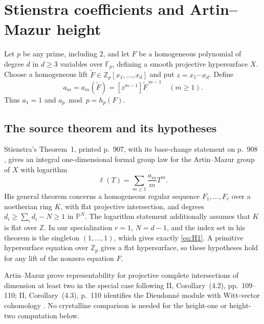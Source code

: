 \section{Stienstra coefficients and Artin--Mazur height}
\label{sec:classical-height}
Let $p$ be any prime, including $2$, and let $F$ be a homogeneous
polynomial of degree $d$ in $d\ge3$ variables over $\mathbb F_p$,
defining a smooth projective hypersurface $X$.
Choose a homogeneous lift $\widetilde F\in\mathbb Z_p[x_1,\ldots,x_d]$
and put $z=x_1\cdots x_d$. Define
\begin{equation}
 a_m=a_m(\widetilde F)=[z^{m-1}]\widetilde F^{\,m-1}\quad(m\ge1).
 \label{eq:H1}
\end{equation}
Thus $a_1=1$ and $a_p\bmod p=h_p(F)$.

\subsection{The source theorem and its hypotheses}
Stienstra's Theorem~1, printed p.~907, with its base-change statement
on p.~908 \citep{Stienstra}, gives an integral one-dimensional formal
group law for the Artin--Mazur group of $X$ with logarithm
\begin{equation}
 \ell(T)=\sum_{m\ge1}\frac{a_m}{m}T^m.                 \label{eq:H2}
\end{equation}
His general theorem concerns a homogeneous regular sequence
$F_1,\ldots,F_r$ over a noetherian ring $K$, with flat projective
intersection, and degrees $d_i\ge \sum_i d_i-N\ge1$ in $\mathbb P^N$.
The logarithm statement additionally assumes that $K$ is flat over
$\mathbb Z$. In our specialization $r=1$, $N=d-1$, and the index set in
his theorem is the singleton $(1,\ldots,1)$, which gives exactly \eqref{eq:H1}.
A primitive hypersurface equation over $\mathbb Z_p$ gives a flat
hypersurface, so these hypotheses hold for any lift of the nonzero
equation $F$.

Artin--Mazur prove representability for projective complete intersections
of dimension at least two in the special case following
II, Corollary~(4.2), pp.~109--110; II, Corollary~(4.3), p.~110 identifies
the Dieudonn\'e module with Witt-vector cohomology
\citep{AM}. No crystalline comparison is needed for the
height-one or height-two computation below.

